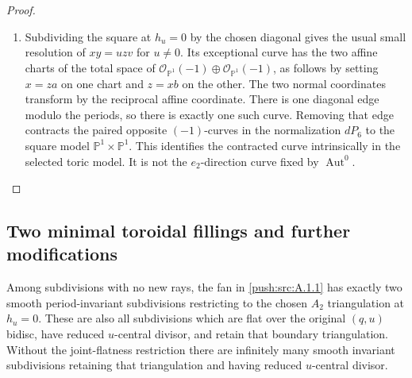\begin{proof}
\begin{enumerate}[label=\arabic*.,leftmargin=*]
\item Subdividing the square at $h_u=0$ by the chosen diagonal gives
the usual small resolution of $xy=uzv$ for $u\ne0$. Its exceptional
curve has the two affine charts of the total space of
$\mathcal O_{\mathbb P^1}(-1)\oplus
\mathcal O_{\mathbb P^1}(-1)$, as follows by setting $x=za$ on
one chart and $z=xb$ on the other. The two normal coordinates
transform by the reciprocal affine coordinate. There is one
diagonal edge modulo the periods, so there is exactly one such
curve. Removing that edge contracts the paired opposite
$(-1)$-curves in the normalization $dP_6$ to the square model
$\mathbb P^1\times\mathbb P^1$. This identifies the contracted
curve intrinsically in the selected toric model. It is not the
$e_2$-direction curve fixed by $\operatorname{Aut}^0$.
\end{enumerate}
\end{proof}

\subsection{Two minimal toroidal fillings and further modifications}\label{push:section:A.2}

\begin{proposition}\label{push:src:A.2.1}\label{push:A21}

Among subdivisions with no new rays, the fan in \ref{push:src:A.1.1} has exactly
two smooth period-invariant subdivisions restricting to the chosen
$A_2$ triangulation at $h_u=0$. These are also all subdivisions
which are flat over the original $(q,u)$ bidisc, have reduced
$u$-central divisor, and retain that boundary triangulation.
Without the joint-flatness restriction there are infinitely many
smooth invariant subdivisions retaining that triangulation and
having reduced $u$-central divisor.
\end{proposition}


